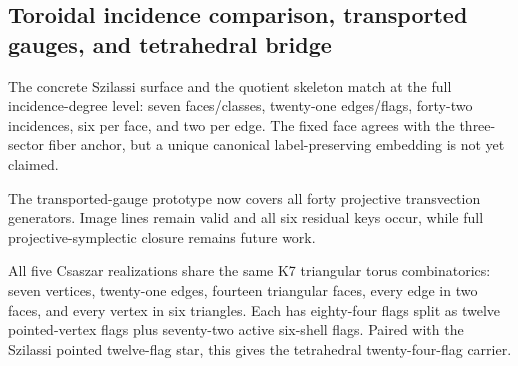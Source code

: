 \subsection{Toroidal incidence comparison, transported gauges, and tetrahedral bridge}
\label{sec:bt1523-bt1526-toroid-transport-tetra}

The concrete Szilassi surface and the quotient skeleton match at the full incidence-degree level: seven faces/classes, twenty-one edges/flags, forty-two incidences, six per face, and two per edge.  The fixed face agrees with the three-sector fiber anchor, but a unique canonical label-preserving embedding is not yet claimed.

The transported-gauge prototype now covers all forty projective transvection generators.  Image lines remain valid and all six residual keys occur, while full projective-symplectic closure remains future work.

All five Csaszar realizations share the same K7 triangular torus combinatorics: seven vertices, twenty-one edges, fourteen triangular faces, every edge in two faces, and every vertex in six triangles.  Each has eighty-four flags split as twelve pointed-vertex flags plus seventy-two active six-shell flags.  Paired with the Szilassi pointed twelve-flag star, this gives the tetrahedral twenty-four-flag carrier.
